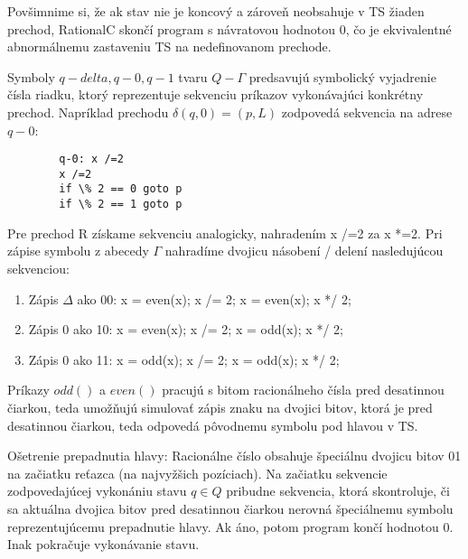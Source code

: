 \documentclass[10pt]{article}
\begin{document}
        Povšimnime si, že ak stav nie je koncový a zároveň neobsahuje v TS žiaden prechod, RationalC
        skončí program s návratovou hodnotou 0, čo je ekvivalentné abnormálnemu zastaveniu TS na
        nedefinovanom prechode.

        Symboly $q-delta, q-0, q-1$ tvaru $Q-\Gamma$ predsavujú symbolický vyjadrenie čísla riadku, ktorý
        reprezentuje sekvenciu príkazov vykonávajúci konkrétny prechod.
        Napríklad prechodu $\delta(q, 0) = (p, L)$ zodpovedá sekvencia na adrese $q-0$:
        \begin{verbatim}
        q-0: x /=2
        x /=2
        if \% 2 == 0 goto p
        if \% 2 == 1 goto p
        \end{verbatim}
        Pre prechod R získame sekvenciu analogicky, nahradením x /=2 za x *=2.
        Pri zápise symbolu z abecedy $\Gamma$ nahradíme dvojicu násobení / delení nasledujúcou
        sekvenciou:
        \begin{enumerate}
            \item Zápis $\Delta$ ako 00: x = even(x); x /= 2; x = even(x); x */ 2;
            \item Zápis $0$ ako 10: x = even(x); x /= 2; x = odd(x); x */ 2;
            \item Zápis $0$ ako 11: x = odd(x); x /= 2; x = odd(x); x */ 2;
        \end{enumerate}
        Príkazy $odd()$ a $even()$ pracujú s bitom racionálneho čísla pred desatinnou čiarkou, teda
        umožňujú simulovať zápis znaku na dvojici bitov, ktorá je pred desatinnou čiarkou, teda
        odpovedá pôvodnemu symbolu pod hlavou v TS.

        Ošetrenie prepadnutia hlavy:
        Racionálne číslo obsahuje špeciálnu dvojicu bitov 01 na začiatku reťazca (na najvyžšich
        pozíciach). Na začiatku sekvencie zodpovedajúcej vykonániu stavu $q \in Q$ pribudne
        sekvencia, ktorá skontroluje, či sa aktuálna dvojica bitov pred desatinnou čiarkou nerovná
        špeciálnemu symbolu reprezentujúcemu prepadnutie hlavy. Ak áno, potom program končí hodnotou
        0. Inak pokračuje vykonávanie stavu.
\end{document}
